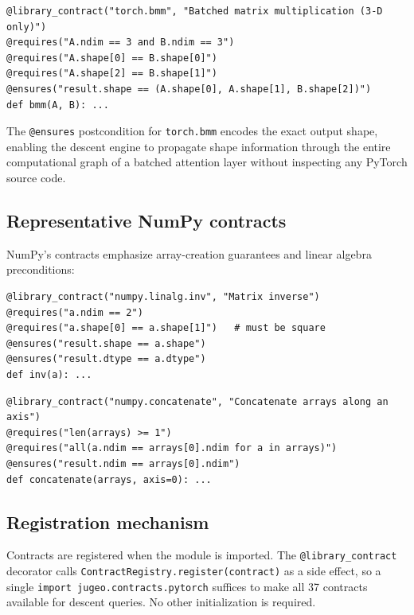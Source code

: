 \documentclass[11pt]{article}
\newcommand{\nPT}{37}                      %
\begin{document}
\begin{lstlisting}[style=jugeo-python,
  caption={PyTorch \texttt{torch.bmm}: batched 3-D matrix multiplication.}]
@library_contract("torch.bmm", "Batched matrix multiplication (3-D only)")
@requires("A.ndim == 3 and B.ndim == 3")
@requires("A.shape[0] == B.shape[0]")
@requires("A.shape[2] == B.shape[1]")
@ensures("result.shape == (A.shape[0], A.shape[1], B.shape[2])")
def bmm(A, B): ...
\end{lstlisting}

The \texttt{@ensures} postcondition for \texttt{torch.bmm} encodes the
exact output shape, enabling the descent engine to propagate shape
information through the entire computational graph of a batched
attention layer without inspecting any PyTorch source code.

\subsection{Representative NumPy contracts}

NumPy's contracts emphasize array-creation guarantees and linear
algebra preconditions:

\begin{lstlisting}[style=jugeo-python,
  caption={NumPy \texttt{numpy.linalg.inv}: matrix inverse.}]
@library_contract("numpy.linalg.inv", "Matrix inverse")
@requires("a.ndim == 2")
@requires("a.shape[0] == a.shape[1]")   # must be square
@ensures("result.shape == a.shape")
@ensures("result.dtype == a.dtype")
def inv(a): ...
\end{lstlisting}

\begin{lstlisting}[style=jugeo-python,
  caption={NumPy \texttt{numpy.concatenate}: array concatenation.}]
@library_contract("numpy.concatenate", "Concatenate arrays along an axis")
@requires("len(arrays) >= 1")
@requires("all(a.ndim == arrays[0].ndim for a in arrays)")
@ensures("result.ndim == arrays[0].ndim")
def concatenate(arrays, axis=0): ...
\end{lstlisting}

\subsection{Registration mechanism}

Contracts are registered when the module is imported.  The
\texttt{@library\_contract} decorator calls
\texttt{ContractRegistry.register(contract)} as a side effect, so a
single \texttt{import jugeo.contracts.pytorch} suffices to make all
\nPT{} contracts available for descent queries.  No other
initialization is required.
\end{document}
